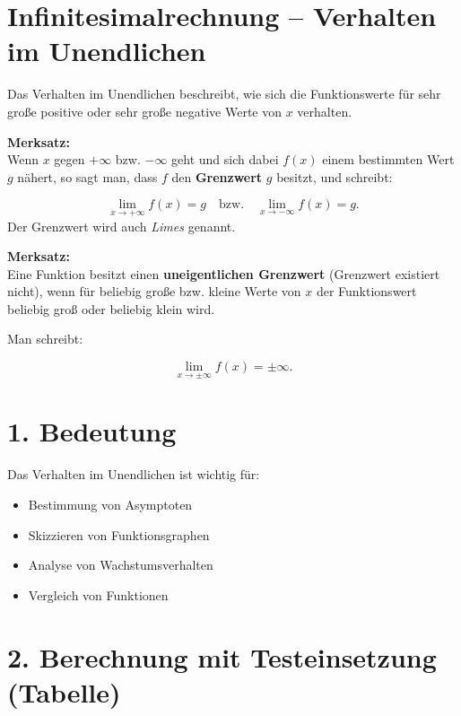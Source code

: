 \documentclass[12pt]{article}
\begin{document}
\section*{Infinitesimalrechnung – Verhalten im Unendlichen}

Das Verhalten im Unendlichen beschreibt, wie sich die Funktionswerte
für sehr große positive oder sehr große negative Werte von \(x\) verhalten.

\begin{tcolorbox}[colback=myblue]
\textbf{Merksatz:}\\
Wenn \(x\) gegen \(+\infty\) bzw. \(-\infty\) geht und sich dabei
\(f(x)\) einem bestimmten Wert \(g\) nähert,
so sagt man, dass \(f\) den \textbf{Grenzwert} \(g\) besitzt, und schreibt:

\[
\lim_{x \to +\infty} f(x) = g
\quad \text{bzw.} \quad
\lim_{x \to -\infty} f(x) = g.
\]
Der Grenzwert wird auch \textit{Limes} genannt.
\end{tcolorbox}

\begin{tcolorbox}[colback=myblue]
\textbf{Merksatz:}\\
Eine Funktion besitzt einen \textbf{uneigentlichen Grenzwert} (Grenzwert existiert nicht),
wenn für beliebig große bzw. kleine Werte von \(x\) der Funktionswert
beliebig groß oder beliebig klein wird.

Man schreibt:

\[
\lim_{x \to \pm\infty} f(x) = \pm\infty.
\]
\end{tcolorbox}

\section*{1. Bedeutung}

Das Verhalten im Unendlichen ist wichtig für:

\begin{itemize}
\item Bestimmung von Asymptoten
\item Skizzieren von Funktionsgraphen
\item Analyse von Wachstumsverhalten
\item Vergleich von Funktionen
\end{itemize}

\section*{2. Berechnung mit Testeinsetzung (Tabelle)}
\end{document}
